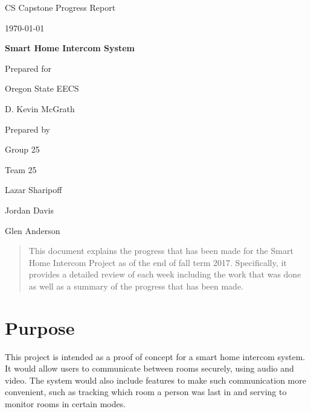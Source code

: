 \documentclass[onecolumn, draftclsnofoot,10pt, compsoc]{IEEEtran}
\def \CapstoneTeamName{		Team 25}
\def \CapstoneTeamNumber{		25}
\def \GroupMemberOne{			Lazar Sharipoff}
\def \GroupMemberTwo{			Jordan Davis}
\def \GroupMemberThree{			Glen Anderson}
\def \CapstoneProjectName{		Smart Home Intercom System}
\def \CapstoneSponsorCompany{	Oregon State EECS}
\def \CapstoneSponsorPerson{		D. Kevin McGrath}
\def \DocType{		%
				Progress Report
				}
\newcommand{\NameSigPair}[1]{\par
\makebox[2.75in][r]{#1} \hfil 	\makebox[3.25in]{\makebox[2.25in]{\hrulefill} \hfill		\makebox[.75in]{\hrulefill}}
\par\vspace{-12pt} \textit{\tiny\noindent
\makebox[2.75in]{} \hfil		\makebox[3.25in]{\makebox[2.25in][r]{Signature} \hfill	\makebox[.75in][r]{Date}}}}
\renewcommand{\NameSigPair}[1]{#1}
\begin{document}
\begin{titlepage}
\begin{singlespace}
\hfill
\par\vspace{.2in}
\centering
\scshape{
\huge CS Capstone \DocType \par
{\large\today}\par
\vspace{.5in}
\textbf{\Huge\CapstoneProjectName}\par
\vfill
{\large Prepared for}\par
\Huge \CapstoneSponsorCompany\par
\vspace{5pt}
{\Large\NameSigPair{\CapstoneSponsorPerson}\par}
{\large Prepared by }\par
Group\CapstoneTeamNumber\par
\CapstoneTeamName\par
\vspace{5pt}
{\Large
\NameSigPair{\GroupMemberOne}\par
\NameSigPair{\GroupMemberTwo}\par
\NameSigPair{\GroupMemberThree}\par
}
\vspace{20pt}
}
\begin{abstract}
	This document explains the progress that has been made for the Smart Home Intercom Project as of the end of fall term 2017. Specifically, it provides a detailed review of each week including the work that was done as well as a summary of the progress that has been made. 
\end{abstract}
\end{singlespace}
\end{titlepage}
\newpage
{}
\tableofcontents
\clearpage

\section{Purpose}
This project is intended as a proof of concept for a smart home intercom system. It would allow users to communicate between rooms securely, using audio and video. The system would also include features to make such communication more convenient, such as tracking which room a person was last in and serving to monitor rooms in certain modes. 
\end{document}
